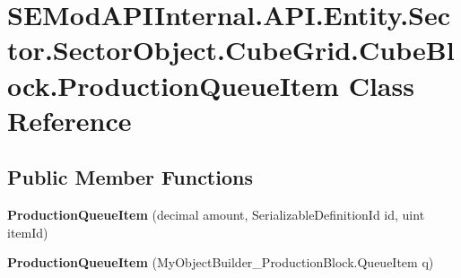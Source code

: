 \hypertarget{class_s_e_mod_a_p_i_internal_1_1_a_p_i_1_1_entity_1_1_sector_1_1_sector_object_1_1_cube_grid_1_199e35bb6148552a88d941dc080ac8a36}{}\section{S\+E\+Mod\+A\+P\+I\+Internal.\+A\+P\+I.\+Entity.\+Sector.\+Sector\+Object.\+Cube\+Grid.\+Cube\+Block.\+Production\+Queue\+Item Class Reference}
\label{class_s_e_mod_a_p_i_internal_1_1_a_p_i_1_1_entity_1_1_sector_1_1_sector_object_1_1_cube_grid_1_199e35bb6148552a88d941dc080ac8a36}
\subsection*{Public Member Functions}
\begin{DoxyCompactItemize}
\item 
\hypertarget{class_s_e_mod_a_p_i_internal_1_1_a_p_i_1_1_entity_1_1_sector_1_1_sector_object_1_1_cube_grid_1_199e35bb6148552a88d941dc080ac8a36_acf0c75b8ce4cd4129a7814f8dd610966}{}{\bfseries Production\+Queue\+Item} (decimal amount, Serializable\+Definition\+Id id, uint item\+Id)\label{class_s_e_mod_a_p_i_internal_1_1_a_p_i_1_1_entity_1_1_sector_1_1_sector_object_1_1_cube_grid_1_199e35bb6148552a88d941dc080ac8a36_acf0c75b8ce4cd4129a7814f8dd610966}

\item 
\hypertarget{class_s_e_mod_a_p_i_internal_1_1_a_p_i_1_1_entity_1_1_sector_1_1_sector_object_1_1_cube_grid_1_199e35bb6148552a88d941dc080ac8a36_ac47af8f15a31bdc56c1aaf50bf5f8b32}{}{\bfseries Production\+Queue\+Item} (My\+Object\+Builder\+\_\+\+Production\+Block.\+Queue\+Item q)\label{class_s_e_mod_a_p_i_internal_1_1_a_p_i_1_1_entity_1_1_sector_1_1_sector_object_1_1_cube_grid_1_199e35bb6148552a88d941dc080ac8a36_ac47af8f15a31bdc56c1aaf50bf5f8b32}

\end{DoxyCompactItemize}
